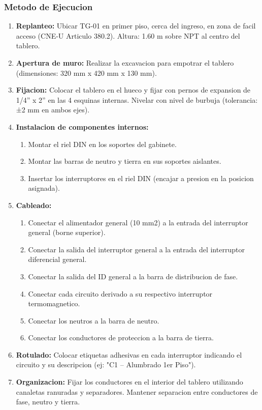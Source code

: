 \subsubsection{Metodo de Ejecucion}

\begin{enumerate}
  \item \textbf{Replanteo:} Ubicar TG-01 en primer piso, cerca del ingreso, en zona de facil acceso (CNE-U Articulo 380.2). Altura: 1.60 m sobre NPT al centro del tablero.
  \item \textbf{Apertura de muro:} Realizar la excavacion para empotrar el tablero (dimensiones: 320 mm x 420 mm x 130 mm).
  \item \textbf{Fijacion:} Colocar el tablero en el hueco y fijar con pernos de expansion de 1/4'' x 2'' en las 4 esquinas internas. Nivelar con nivel de burbuja (tolerancia: ±2 mm en ambos ejes).
  \item \textbf{Instalacion de componentes internos:}
  \begin{enumerate}
    \item Montar el riel DIN en los soportes del gabinete.
    \item Montar las barras de neutro y tierra en sus soportes aislantes.
    \item Insertar los interruptores en el riel DIN (encajar a presion en la posicion asignada).
  \end{enumerate}
  \item \textbf{Cableado:}
  \begin{enumerate}
    \item Conectar el alimentador general (10 mm2) a la entrada del interruptor general (borne superior).
    \item Conectar la salida del interruptor general a la entrada del interruptor diferencial general.
    \item Conectar la salida del ID general a la barra de distribucion de fase.
    \item Conectar cada circuito derivado a su respectivo interruptor termomagnetico.
    \item Conectar los neutros a la barra de neutro.
    \item Conectar los conductores de proteccion a la barra de tierra.
  \end{enumerate}
  \item \textbf{Rotulado:} Colocar etiquetas adhesivas en cada interruptor indicando el circuito y su descripcion (ej: "C1 -- Alumbrado 1er Piso").
  \item \textbf{Organizacion:} Fijar los conductores en el interior del tablero utilizando canaletas ranuradas y separadores. Mantener separacion entre conductores de fase, neutro y tierra.
\end{enumerate}

